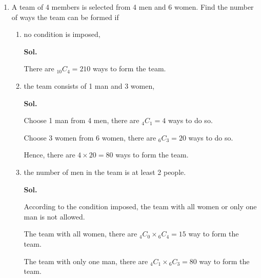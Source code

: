 \documentclass{report}
\newcommand\comb[2][^n]{{}_{#1}C_{#2}}
\newcommand{\sol}[1]{

      \noindent \textbf{Sol.}
}
\def\eos{\quad\hbox{\rlap{\hbox{\vrule depth 1.5pt height 2.6mm width 0.2mm \hskip 1mm \vrule height 2.6mm width 0.2mm}}{\vbox{\hrule height 0.2mm width 1.4mm \vskip 2.8mm \hrule depth 1.5pt height -0.35mm width 1.2mm}}}}
\begin{document}
\begin{multicols*}{2}
\begin{enumerate}
\begin{enumerate}
                        \item a prime number is chosen, \sol{}

                              There are 4 cards of prime digit. Hence, there are $\comb[4]{1} = 4$ ways to
                              choose them. $\eos$

                        \item the number that is less than 6 is chosen. \sol{}

                              There are 4 cards of digit less than 6. Hence, there are $\comb[4]{1} = 4$ ways
                              to choose them. $\eos$
                  \end{enumerate}

            \item A team of 4 members is selected from 4 men and 6 women. Find the number of ways
                  the team can be formed if
                  \begin{enumerate}
                        \item no condition is imposed, \sol{}

                              There are $\comb[10]{4} = 210$ ways to form the team. $\eos$

                        \item the team consists of 1 man and 3 women, \sol{}

                              Choose 1 man from 4 men, there are $\comb[4]{1} = 4$ ways to do so.

                              Choose 3 women from 6 women, there are $\comb[6]{3} = 20$ ways to do so.

                              Hence, there are $4 \times 20 = 80$ ways to form the team. $\eos$

                        \item the number of men in the team is at least 2 people. \sol{}

                              According to the condition imposed, the team with all women or only one man is
                              not allowed.

                              The team with all women, there are $\comb[4]{0} \times \comb[6]{4} = 15$ way to
                              form the team.

                              The team with only one man, there are $\comb[4]{1} \times \comb[6]{3} = 80$ way
                              to form the team.


\end{enumerate}
\end{enumerate}
\end{multicols*}
\end{document}

